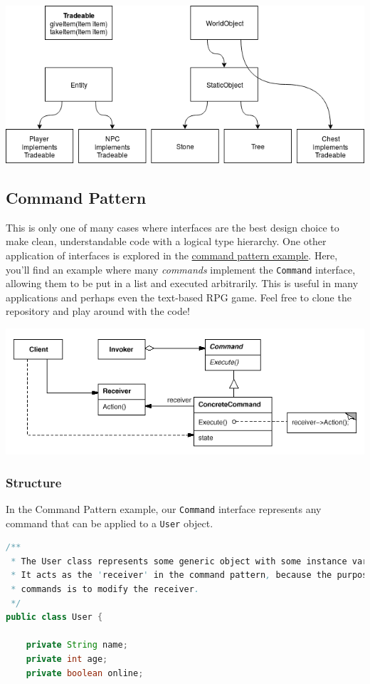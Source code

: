 \documentclass{article}
\begin{document}
    		\includegraphics[width=\textwidth]{images/interfaces/classesWithInterface.png}

    	\subsection{Command Pattern}
    		This is only one of many cases where interfaces are the best design choice to make clean, understandable code with a logical type hierarchy. One other application of interfaces is explored in the \href{https://github.com/andrewlalis/CommandPatternTutorial}{command pattern example}. Here, you'll find an example where many \textit{commands} implement the \verb|Command| interface, allowing them to be put in a list and executed arbitrarily. This is useful in many applications and perhaps even the text-based RPG game. Feel free to clone the repository and play around with the code!

    		\includegraphics[width=\textwidth]{images/interfaces/commandPattern.png}

	    	\subsubsection{Structure}
	    		In the Command Pattern example, our \verb|Command| interface represents any command that can be applied to a \verb|User| object.

	    		\begin{lstlisting}[language=java]
/**
 * The User class represents some generic object with some instance variables.
 * It acts as the 'receiver' in the command pattern, because the purpose of
 * commands is to modify the receiver.
 */
public class User {

    private String name;
    private int age;
    private boolean online;
	    		\end{lstlisting}
\end{document}
